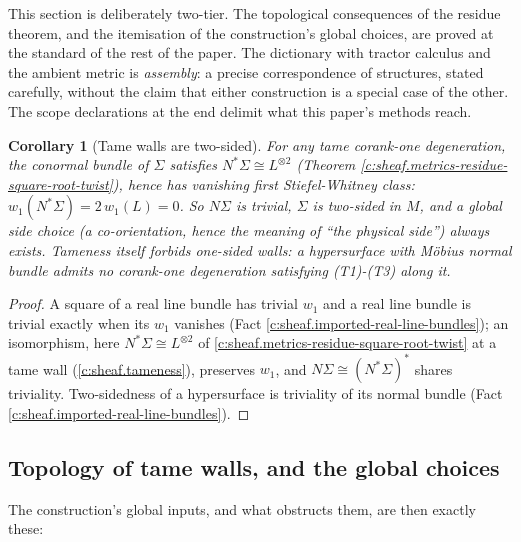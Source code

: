 \documentclass[11pt]{article}
\newtheorem{corollary}[theorem]{Corollary}
\theoremstyle{definition}
\theoremstyle{plain}
\newcommand{\changedmark}[2]{\marginpar{\raggedright\scriptsize\color{#1}#2}}
\providecommand{\Sig}{}\renewcommand{\Sig}{\Sigma}
\providecommand{\shL}{}\renewcommand{\shL}{L}
\begin{document}
\label{c:note.sheaf.setting-dictionary-choices-scope}
This section is deliberately two-tier. The topological consequences of the residue theorem, and the itemisation of the construction's global choices, are proved at the standard of the rest of the paper. The dictionary with tractor calculus and the ambient metric is \emph{assembly}: a precise correspondence of structures, stated carefully, without the claim that either construction is a special case of the other. The scope declarations at the end delimit what this paper's methods reach.

\begin{corollary}[Tame walls are two-sided]\label{c:sheaf.tame-walls-are-two-sided}
\changedmark{gray}{reworded}
For any tame corank-one degeneration, the conormal bundle of $\Sig$ satisfies $N^*\Sig \cong \shL^{\otimes 2}$ (Theorem \ref{c:sheaf.metrics-residue-square-root-twist}), hence has vanishing first Stiefel-Whitney class: $w_1(N^*\Sig) = 2\,w_1(\shL) = 0$. So $N\Sig$ is trivial, $\Sig$ is two-sided in $M$, and a global side choice (a co-orientation, hence the meaning of ``the physical side'') always exists. Tameness itself forbids one-sided walls: a hypersurface with M\"obius normal bundle admits no corank-one degeneration satisfying (T1)-(T3) along it.
\end{corollary}
\begin{proof}
A square of a real line bundle has trivial $w_1$ and a real line bundle is trivial exactly when its $w_1$ vanishes (Fact \ref{c:sheaf.imported-real-line-bundles}); an isomorphism, here $N^*\Sig \cong \shL^{\otimes 2}$ of \ref{c:sheaf.metrics-residue-square-root-twist} at a tame wall (\ref{c:sheaf.tameness}), preserves $w_1$, and $N\Sig \cong (N^*\Sig)^*$ shares triviality. Two-sidedness of a hypersurface is triviality of its normal bundle (Fact \ref{c:sheaf.imported-real-line-bundles}).

\end{proof}

\subsection*{Topology of tame walls, and the global choices}
\label{c:note.sheaf.setting-topology-tame-walls-global-choices}
The construction's global inputs, and what obstructs them, are then exactly these:
\end{document}
